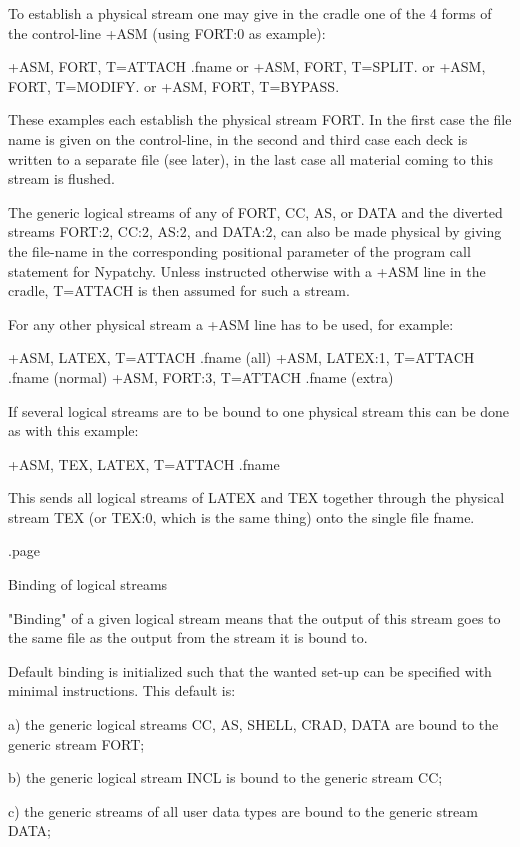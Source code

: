 To establish a physical stream one may give in the cradle one of the
4 forms of the control-line +ASM (using FORT:0 as example):

      +ASM, FORT, T=ATTACH   .fname
  or  +ASM, FORT, T=SPLIT.
  or  +ASM, FORT, T=MODIFY.
  or  +ASM, FORT, T=BYPASS.

These examples each establish the physical stream FORT. In the first case
the file name is given on the control-line, in the second and third case
each deck is written to a separate file (see later), in the last case
all material coming to this stream is flushed.

The generic logical streams of any of FORT, CC, AS, or DATA and the
diverted streams FORT:2, CC:2, AS:2, and DATA:2, can also be made
physical by giving the file-name in the corresponding positional
parameter of the program call statement for Nypatchy. Unless instructed
otherwise with a +ASM line in the cradle, T=ATTACH is then assumed
for such a stream.

For any other physical stream a +ASM line has to be used, for example:

      +ASM, LATEX,   T=ATTACH   .fname      (all)
      +ASM, LATEX:1, T=ATTACH   .fname      (normal)
      +ASM, FORT:3,  T=ATTACH   .fname      (extra)

If several logical streams are to be bound to one physical stream this
can be done as with this example:

      +ASM, TEX, LATEX, T=ATTACH   .fname

This sends all logical streams of LATEX and TEX together through the
physical stream TEX (or TEX:0, which is the same thing) onto the
single file fname.

.page
\item
Binding of logical streams

"Binding" of a given logical stream means that the output of this stream
goes to the same file as the output from the stream it is bound to.

Default binding is initialized such that the wanted set-up can be
specified with minimal instructions. This default is:

   a) the generic logical streams CC, AS, SHELL, CRAD, DATA are bound
      to the generic stream FORT;

   b) the generic logical stream INCL is bound to the generic stream CC;

   c) the generic streams of all user data types are bound to
      the generic stream DATA;

